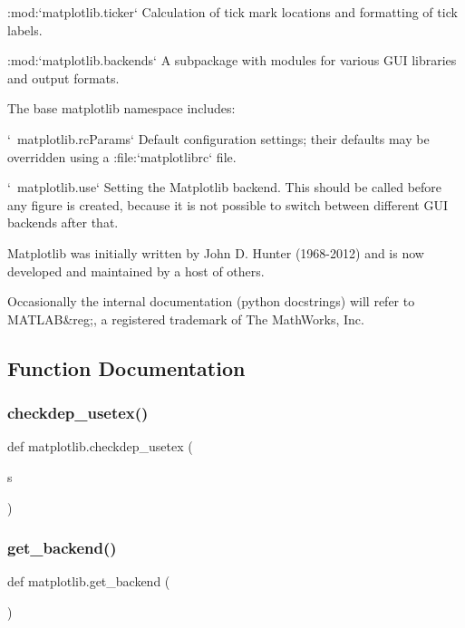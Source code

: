 \begin{DoxyVerb}
:mod:`matplotlib.ticker`
    Calculation of tick mark locations and formatting of tick labels.

:mod:`matplotlib.backends`
    A subpackage with modules for various GUI libraries and output formats.

The base matplotlib namespace includes:

`~matplotlib.rcParams`
    Default configuration settings; their defaults may be overridden using
    a :file:`matplotlibrc` file.

`~matplotlib.use`
    Setting the Matplotlib backend.  This should be called before any
    figure is created, because it is not possible to switch between
    different GUI backends after that.

Matplotlib was initially written by John D. Hunter (1968-2012) and is now
developed and maintained by a host of others.

Occasionally the internal documentation (python docstrings) will refer
to MATLAB&reg;, a registered trademark of The MathWorks, Inc.
\end{DoxyVerb}
 

\subsection{Function Documentation}
\mbox{\label{namespacematplotlib_ae3f7a6228bd1dfa27450b84c15a72622}} 
\subsubsection{\texorpdfstring{checkdep\+\_\+usetex()}{checkdep\_usetex()}}
{\footnotesize\ttfamily def matplotlib.\+checkdep\+\_\+usetex (\begin{DoxyParamCaption}\item[{}]{s }\end{DoxyParamCaption})}

\mbox{\label{namespacematplotlib_a4c414ede927e60a4232f5b74394dd30f}} 
\subsubsection{\texorpdfstring{get\+\_\+backend()}{get\_backend()}}
{\footnotesize\ttfamily def matplotlib.\+get\+\_\+backend (\begin{DoxyParamCaption}{ }\end{DoxyParamCaption})}

